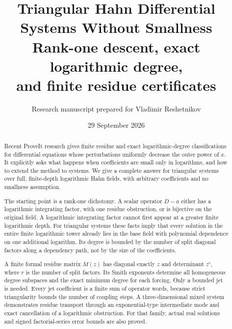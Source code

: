\documentclass[11pt,a4paper]{article}
\title{\textbf{Triangular Hahn Differential\\Systems Without Smallness}\\[0.65em]\large Rank-one descent, exact logarithmic degree,\\and finite residue certificates}
\author{Research manuscript prepared for Vladimir Reshetnikov}
\date{29 September 2026}
\numberwithin{equation}{section}
\theoremstyle{definition}
\theoremstyle{remark}\newtheorem{remark}[theorem]{Remark}
\begin{document}
\maketitle\thispagestyle{empty}
\begin{abstract}
Recent ProveIt research gives finite residue and exact logarithmic-degree classifications for differential equations whose perturbations uniformly decrease the outer power of $x$. It explicitly asks what happens when coefficients are small only in logarithms, and how to extend the method to systems. We give a complete answer for triangular systems over full, finite-depth logarithmic Hahn fields, with arbitrary coefficients and no smallness assumption.

The starting point is a rank-one dichotomy. A scalar operator $D-a$ either has a logarithmic integrating factor, with one residue obstruction, or is bijective on the original field. A logarithmic integrating factor cannot first appear at a greater finite logarithmic depth. For triangular systems these facts imply that every solution in the entire finite logarithmic tower already lies in the base field with polynomial dependence on one additional logarithm. Its degree is bounded by the number of split diagonal factors along a dependency path, not by the size of the coefficients.

A finite formal residue matrix $M(z)$ has diagonal exactly $z$ and determinant $z^r$, where $r$ is the number of split factors. Its Smith exponents determine all homogeneous degree subspaces and the exact minimum degree for each forcing. Only a bounded jet is needed. Every jet coefficient is a finite sum of operator words, because strict triangularity bounds the number of coupling steps. A three-dimensional mixed system demonstrates residue transport through an exponential-type intermediate mode and exact cancellation of a logarithmic obstruction. For that family, actual real solutions and signed factorial-series error bounds are also proved.
\end{abstract}
\vfill
\noindent{}
\clearpage
\setcounter{tocdepth}{1}\tableofcontents
\end{document}
